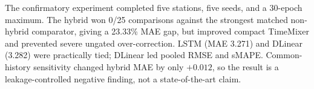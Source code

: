 The confirmatory experiment completed five stations, five seeds, and a 30-epoch maximum. The hybrid won 0/25 comparisons against the strongest matched non-hybrid comparator, giving a 23.33\% MAE gap, but improved compact TimeMixer and prevented severe ungated over-correction. LSTM (MAE 3.271) and DLinear (3.282) were practically tied; DLinear led pooled RMSE and sMAPE. Common-history sensitivity changed hybrid MAE by only \( +0.012 \), so the result is a leakage-controlled negative finding, not a state-of-the-art claim.
